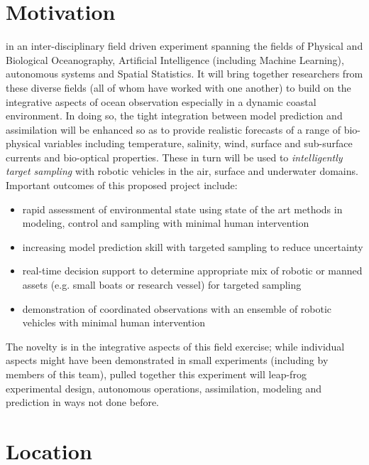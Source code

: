 \section*{Motivation}

\proj in an inter-disciplinary field driven experiment spanning the
fields of Physical and Biological Oceanography, Artificial
Intelligence (including Machine Learning), autonomous systems and
Spatial Statistics. It will bring together researchers from these
diverse fields (all of whom have worked with one another) to build on
the integrative aspects of ocean observation especially in a dynamic
coastal environment.  In doing so, the tight integration between model
prediction and assimilation will be enhanced so as to provide
realistic forecasts of a range of bio-physical variables including
temperature, salinity, wind, surface and sub-surface currents and
bio-optical properties. These in turn will be used to
\emph{intelligently target sampling} with robotic vehicles in the air,
surface and underwater domains. Important outcomes of this proposed
project include:

\begin{itemize}[noitemsep,topsep=5pt,parsep=0pt,partopsep=0pt,leftmargin=0.5cm]

\item rapid assessment of environmental state using state of the art
  methods in modeling, control and sampling with minimal human intervention
\item increasing model prediction skill with targeted sampling to
  reduce uncertainty
\item real-time decision support to determine appropriate mix of
  robotic or manned assets (e.g. small boats or research vessel) for
  targeted sampling
\item demonstration of coordinated observations with an ensemble of
  robotic vehicles with minimal human intervention
\end{itemize}

The novelty is in the integrative aspects of this field exercise;
while individual aspects might have been demonstrated in small
experiments (including by members of this team), pulled together this
experiment will leap-frog experimental design, autonomous operations,
assimilation, modeling and prediction in ways not done before.

\section*{Location}

